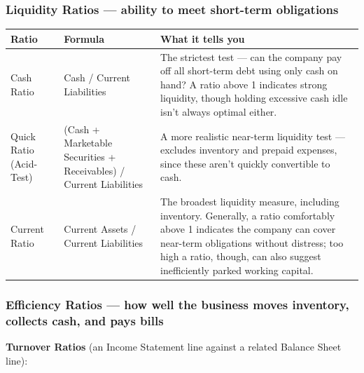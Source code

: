 \documentclass[12pt,openany]{book}
\begin{document}
\subsubsection{Liquidity Ratios --- ability to meet short-term obligations}

\begingroup
\small
\setlength{\tabcolsep}{4pt}
\begin{center}\begin{tabular}{|L{0.22\textwidth}|L{0.24\textwidth}|L{0.42\textwidth}|}
\hline
\textbf{Ratio} & \textbf{Formula} & \textbf{What it tells you} \\
\hline
Cash Ratio & Cash / Current Liabilities & The strictest test --- can the company pay off all short-term debt using only cash on hand? A ratio above 1 indicates strong liquidity, though holding excessive cash idle isn't always optimal either. \\
\hline
Quick Ratio (Acid-Test) & (Cash + Marketable Securities + Receivables) / Current Liabilities & A more realistic near-term liquidity test --- excludes inventory and prepaid expenses, since these aren't quickly convertible to cash. \\
\hline
Current Ratio & Current Assets / Current Liabilities & The broadest liquidity measure, including inventory. Generally, a ratio comfortably above 1 indicates the company can cover near-term obligations without distress; too high a ratio, though, can also suggest inefficiently parked working capital. \\
\hline
\end{tabular}\end{center}
\endgroup

\subsubsection{Efficiency Ratios --- how well the business moves inventory, collects cash, and pays bills}

\textbf{Turnover Ratios} (an Income Statement line against a related Balance Sheet line):
\end{document}

